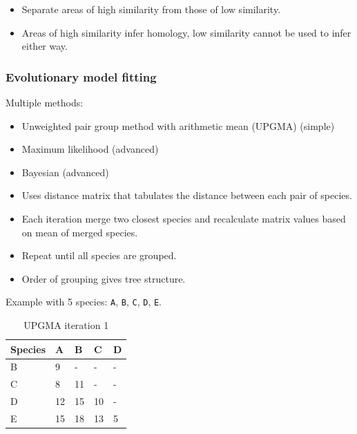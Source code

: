 \documentclass[a4paper]{article}
\begin{document}
\begin{itemize}
  \item
    Separate areas of high similarity from those of low similarity.

  \item
    Areas of high similarity infer homology, low similarity cannot be used to
    infer either way.

\end{itemize}

\subsubsection{Evolutionary model fitting}

Multiple methods:

\begin{itemize}
  \item
    Unweighted pair group method with arithmetic mean (UPGMA) (simple)

  \item
    Maximum likelihood (advanced)

  \item
    Bayesian (advanced)

\end{itemize}


\begin{itemize}
  \item
    Uses distance matrix that tabulates the distance between each pair of
    species.

  \item
    Each iteration merge two closest species and recalculate matrix values based
    on mean of merged species.

  \item
    Repeat until all species are grouped.

  \item
    Order of grouping gives tree structure.

\end{itemize}

Example with 5 species: \texttt{A}, \texttt{B}, \texttt{C}, \texttt{D},
\texttt{E}.

\begin{table}[h!]
  \centering
  \begin{tabular}{@{}lllll@{}}
    \toprule
    Species & A  & B  & C  & D \\
    \midrule
    B       & 9  & -  & -  & - \\
    C       & 8  & 11 & -  & - \\
    D       & 12 & 15 & 10 & - \\
    E       & 15 & 18 & 13 & 5 \\
    \bottomrule
  \end{tabular}
  \caption{UPGMA iteration 1}
  \label{tab:upgma_1}
\end{table}
\FloatBarrier
\end{document}
